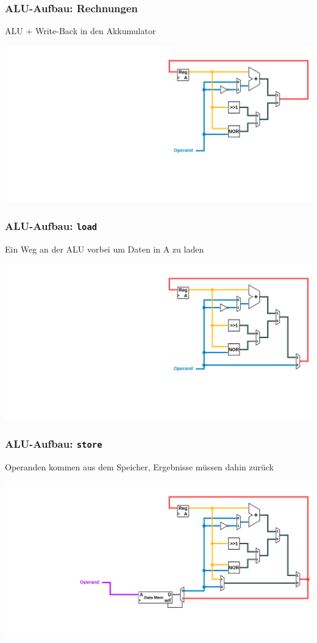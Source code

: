 \documentclass[t,aspectratio=169,usenames,dvipsnames]{beamer}
\begin{document}
\begin{frame}
  \frametitle{ALU-Aufbau: Rechnungen}

  \strut{}ALU + Write-Back in den Akkumulator

  \begin{center}
    \includegraphics[width=.85\textwidth]{sch-alu.pdf}
  \end{center}
\end{frame}

\begin{frame}
  \frametitle{ALU-Aufbau: \texttt{load}}

  \strut{}Ein Weg an der ALU vorbei um Daten in A zu laden

  \begin{center}
    \includegraphics[width=.85\textwidth]{sch-load.pdf}
  \end{center}
\end{frame}

\begin{frame}
  \frametitle{ALU-Aufbau: \texttt{store}}

  \strut{}Operanden kommen aus dem Speicher, Ergebnisse müssen dahin zurück

  \begin{center}
    \includegraphics[width=.85\textwidth]{sch-loadstore.pdf}
  \end{center}
\end{frame}
\end{document}
